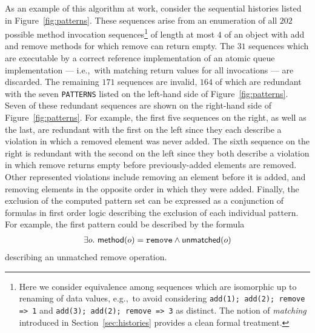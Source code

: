 As an example of this algorithm at work, consider the sequential histories
listed in Figure~\ref{fig:patterns}. These sequences arise from an enumeration
of all $202$ possible method invocation sequences\footnote{Here we consider
equivalence among sequences which are isomorphic up to renaming of data values,
e.g.,~to avoid considering {\tt add(1); add(2); remove => 1} and {\tt add(3);
add(2); remove => 3} as distinct. The notion of \emph{matching} introduced in
Section~\ref{sec:histories} provides a clean formal treatment.} of length at
most $4$ of an object with add and remove methods for which remove can return
empty. The $31$ sequences which are executable by a correct reference
implementation of an atomic queue implementation --- i.e.,~with matching return
values for all invocations --- are discarded. The remaining $171$ sequences are
invalid, $164$ of which are redundant with the seven {\tt PATTERNS} listed on
the left-hand side of Figure~\ref{fig:patterns}. Seven of these redundant
sequences are shown on the right-hand side of Figure~\ref{fig:patterns}. For
example, the first five sequences on the right, as well as the last, are
redundant with the first on the left since they each describe a violation in
which a removed element was never added. The sixth sequence on the right is
redundant with the second on the left since they both describe a violation in
which remove returns empty before previously-added elements are removed. Other
represented violations include removing an element before it is added, and
removing elements in the opposite order in which they were added. Finally, the
exclusion of the computed pattern set can be expressed as a conjunction of
formulas in first order logic describing the exclusion of each individual
pattern. For example, the first pattern could be described by the formula
\begin{align*}
  \exists o.\
    {\sf method}(o) = {\tt remove} \land {\sf unmatched}(o)
\end{align*}
describing an unmatched remove operation.

